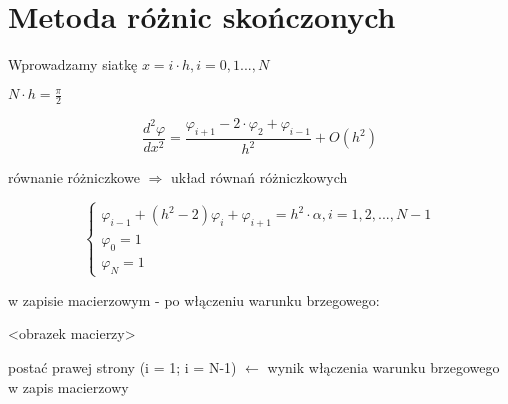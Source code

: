 \section{Metoda różnic skończonych}

Wprowadzamy siatkę $x = i \cdot h, i = 0,1 ... , N$

$N \cdot h = \frac{\pi}{2}$

$$
\frac{d^2 \varphi}{dx^2} = \frac{\varphi_{i+1} - 2 \cdot \varphi_2 + \varphi_{i-1}}{h^2} + O(h^2)
$$

równanie różniczkowe $\Rightarrow$ układ równań różniczkowych

$$
\begin{cases}
	\varphi_{i-1} + (h^2 - 2)\varphi_i + \varphi_{i+1} = h^2 \cdot \alpha, i = 1,2, ..., N-1 \\
	\varphi_0 = 1 \\
	\varphi_N = 1
\end{cases}
$$

w zapisie macierzowym - po włączeniu warunku brzegowego:

<obrazek macierzy>

postać prawej strony (i = 1; i = N-1) $\leftarrow$ wynik włączenia warunku brzegowego w zapis macierzowy

